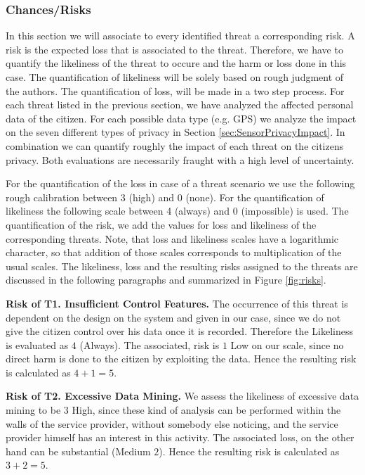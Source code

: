 \documentclass[runningheads,a4paper]{llncs}
\begin{document}
\subsubsection{Chances/Risks}

In this section we will associate to every identified threat a corresponding risk. A risk is the expected loss that is associated to the threat.
Therefore, we have to quantify the likeliness of the threat to occure and the harm or loss done in this case.
The quantification of likeliness will be solely based on rough judgment of the authors.
The quantification of loss, will be made in a two step process.
For each threat listed in the previous section, we have analyzed the affected personal data of the citizen.
For each possible data type (e.g. GPS) we analyze the impact on the seven different types of privacy in Section \ref{sec:SensorPrivacyImpact}.
In combination we can quantify roughly the impact of each threat on the citizens privacy. Both evaluations are necessarily fraught with a high level of uncertainty.

For the quantification of the loss in case of a threat scenario we use the following rough calibration between 3 (high) and 0 (none). For the quantification of likeliness the following scale between 4 (always) and 0 (impossible) is used. The quantification of the risk, we add the values for loss and likeliness of the corresponding threats. Note, that loss and
likeliness scales have a logarithmic character, so that addition
of those scales corresponds to multiplication of the usual scales. The likeliness, loss and the resulting risks assigned to the threats
are discussed in the following paragraphs and summarized in Figure
\ref{fig:risks}.

\textbf{Risk of T1. Insufficient Control Features.}  The occurrence of this
threat is dependent on the design on the system and given in our case,
since we do not give the citizen control over his data once it is
recorded. Therefore the Likeliness is evaluated as $4$ (Always).  The
associated, risk is $1$ Low on our scale, since no direct harm is done to
the citizen by exploiting the data. Hence the resulting risk is calculated as $4+1 = 5$.

\textbf{Risk of T2. Excessive Data Mining.}
We assess the likeliness of excessive data mining to be $3$ High, since
these kind of analysis can be performed within the walls of the service
provider, without somebody else noticing, and the service provider himself
has an interest in this activity. The associated loss, on the other hand can be substantial (Medium $2$). Hence the resulting risk is calculated as $3+2 = 5$.
\end{document}

